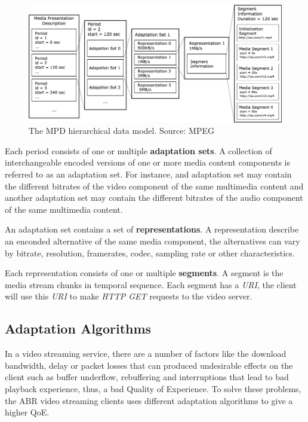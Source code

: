 \begin{figure}[h]
  \centering
  \includegraphics[width=\textwidth]{img/mpd.png}
  \caption{The MPD hierarchical data model. Source: MPEG \cite{ios1}}
  \label{fig:mpd}
\end{figure}

Each period consists of one or multiple \textbf{adaptation sets}. A collection of interchangeable 
encoded versions of one or more media content components is referred to as an adaptation set. For instance,
and adaptation set may contain the different bitrates of the video component of the same multimedia content
and another adaptation set may contain the different bitrates of the audio component of the same multimedia
content.

An adaptation set contains a set of \textbf{representations}. A representation describe an enconded
alternative of the same media component, the alternatives can vary by bitrate, resolution, framerates, 
codec, sampling rate or other characteristics.

Each representation consists of one or multiple \textbf{segments}. A segment is the media stream chunks
in temporal sequence. Each segment has a \textit{URI}, the client will use this \textit{URI} to make
\textit{HTTP GET} requests to the video server. 


\subsection{Adaptation Algorithms}
\label{sec:adap}

In a video streaming service, there are a number of factors like the download bandwidth, delay or packet losses
that can produced undesirable effects on the client such as buffer underflow, rebuffering and interruptions
that lead to bad playback experience, thus, a bad Quality of Experience. To solve these problems, the ABR video
streaming clients uses different adaptation algorithms to give a higher QoE.

